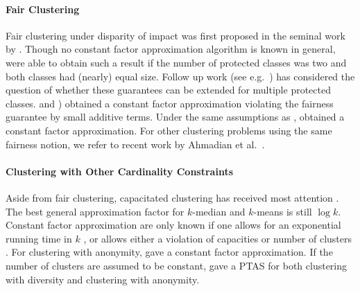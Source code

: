 \paragraph{Fair Clustering}
Fair clustering under disparity of impact was first proposed in the seminal work by \cite{CKLV17}. Though no constant factor approximation algorithm is known in general, \cite{CKLV17} were able to obtain such a result if the number of protected classes was two and both classes had (nearly) equal size. Follow up work (see e.g.~\cite{BCN19,BGKKRSS19,RS18,SSS19}) has considered the question of whether these
guarantees can be extended for multiple protected classes.  \cite{BGKKRSS19} and \cite{BCN19}) obtained a constant factor approximation violating the fairness guarantee by small additive terms.
Under the same assumptions as \cite{CKLV17}, \cite{BohmFLMS21} obtained a constant factor approximation.
For other clustering problems using the same fairness notion, we refer to recent work by Ahmadian et al.~\cite{AhmadianE0M20,AhmadianEK0MMPV20}.

\paragraph{Clustering with Other Cardinality Constraints}
Aside from fair clustering, capacitated clustering has received most attention \cite{AdamczykBMM019,CyganHK12,DemirciL16,Li15,Li17}. The best general approximation factor for $k$-median and $k$-means is still $\log k$. Constant factor approximation are only known if one allows for an exponential running time in $k$ \cite{AdamczykBMM019,Cohen-AddadL19}, or allows either a violation of capacities or number of clusters \cite{DemirciL16,Li15,Li17}. For clustering with anonymity, \cite{Arutyunova021} gave a constant factor approximation. If the number of clusters are assumed to be constant, \cite{DingX15} gave a PTAS for both clustering with diversity and clustering with anonymity.


